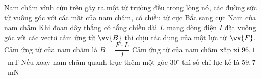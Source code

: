 \begin{ex}
\begin{center}
\begin{tikzpicture}[scale=0.75,z={(0.45cm,0.3cm)},line join=round,line cap=round,font=\footnotesize]
			\end{tikzpicture}
		\end{center}
		\choiceTFt
		{\True Nam châm vĩnh cửu trên gây ra một từ trường đều trong lòng nó, các đường sức từ vuông góc với các mặt của nam châm, có chiều từ cực Bắc sang cực Nam của nam châm}
		{Khi đoạn dây thẳng có tổng chiều dài $L$ mang dòng điện $I$ đặt vuông góc với các vectơ cảm ứng từ $\vv{B}$ thì chịu tác dụng của một lực từ $\vv{F}$. Cảm ứng từ của nam châm là $B=\dfrac{F\cdot L}{I}$}
		{\True Cảm ứng từ của nam châm xấp xỉ $96{,}1$~mT}
		{\True Nếu xoay nam châm quanh trục thêm một góc $30^\circ$ thì số chỉ lực kế là $59{,}7$~mN}
	\end{ex}


